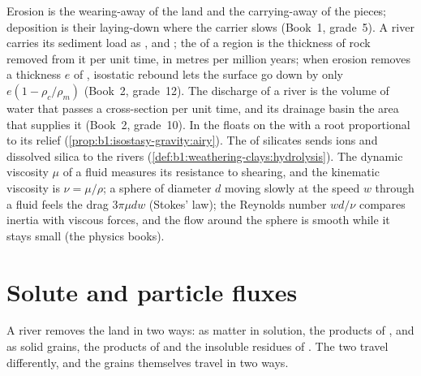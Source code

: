 \begin{recall}
Erosion is the wearing-away of the land and the carrying-away of the pieces;
deposition is their laying-down where the carrier slows (Book~1, grade~5). A
river carries its sediment load as ,  and ; the  of a region is the thickness of rock removed from it
per unit time, in metres per million years; when erosion removes a thickness
$e$ of , isostatic rebound lets the surface go down by only
$e(1 - \rho_c/\rho_m)$ (Book~2, grade~12). The discharge of a river is the
volume of water that passes a cross-section per unit time, and its drainage
basin the area that supplies it (Book~2, grade~10). In  the 
floats on the  with a root proportional to its relief
(\cref{prop:b1:isostasy-gravity:airy}). The  of silicates sends ions
and dissolved silica to the rivers (\cref{def:b1:weathering-clays:hydrolysis}).
The dynamic viscosity $\mu$ of a fluid measures its resistance to shearing,
and the kinematic viscosity is $\nu = \mu/\rho$; a sphere of diameter $d$
moving slowly at the speed $w$ through a fluid feels the drag $3\pi\mu d w$
(Stokes' law); the Reynolds number $w d/\nu$ compares inertia with viscous
forces, and the flow around the sphere is smooth while it stays small (the
physics books).
\end{recall}

\section{Solute and particle fluxes}\label{sec:b1:erosion-transport:fluxes}

A river removes the land in two ways: as matter in solution, the products of
, and as solid grains, the products of 
and the insoluble residues of . The two travel differently,
and the grains themselves travel in two ways.

